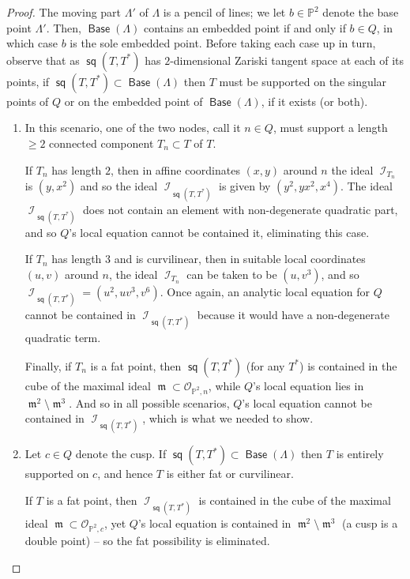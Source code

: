 \documentclass{article}
\renewcommand{\P}{\mathbb{P}}
\DeclareMathOperator{\I}{\mathcal{I}}
\renewcommand{\O}{\mathcal{O}}
\DeclareMathOperator{\s}{\mathsf{sq}}
\DeclareMathOperator{\Base}{\mathsf{Base}}
\DeclareMathOperator{\m}{\mathfrak{m}}
\begin{document}
\begin{proof}
    The moving part $\Lambda'$ of $\Lambda$ is a pencil of lines; we let $b \in \P^{2}$ denote the base point $\Lambda'$.  Then, $\Base (\Lambda)$ contains an embedded point if and only if $b \in Q$, in which case $b$ is the sole embedded point. Before taking each case up in turn, observe that as $\s(T,T^{*})$ has $2$-dimensional Zariski tangent space at each of its points, if $\s(T,T^{*}) \subset \Base(\Lambda)$ then $T$ must be supported on the singular points of $Q$ or on the embedded point of $\Base(\Lambda)$, if it exists (or both).
    \begin{enumerate}
        \item[(a)] In this scenario, one of the two nodes, call it $n \in Q$, must support a length $\geq 2$ connected component $T_{n} \subset T$ of $T$. 
        
        If $T_{n}$ has length $2$, then in affine coordinates $(x,y)$ around $n$ the ideal $\I_{T_{n}}$ is $(y,x^{2})$ and so the ideal $\I_{\s(T,T^{*})}$ is given by $(y^{2},yx^{2},x^{4})$.  The ideal $\I_{\s(T,T^{*})}$ does not contain an element with non-degenerate quadratic part, and so $Q$'s local equation cannot be contained it, eliminating this case.  
        
        If $T_{n}$ has length $3$ and is curvilinear, then in suitable  local coordinates $(u,v)$ around $n$, the ideal $\I_{T_{n}}$ can be taken to be $(u,v^{3})$, and so $\I_{\s(T,T^{*})} = (u^{2},uv^{3},v^{6})$.  Once again, an analytic local equation for $Q$ cannot  be contained in $\I_{\s(T,T^{*})}$ because it would have a non-degenerate quadratic term. 
        
        Finally, if $T_{n}$ is a fat point, then $\s(T,T^{*})$ (for any $T^{*}$) is contained in the cube of the maximal ideal $\m \subset \O_{\P^{2},n}$, while $Q$'s local equation lies in $\m^{2} \setminus \m^{3}$.  And so in all possible scenarios, $Q$'s local equation cannot be contained in $\I_{\s(T,T^{*})}$, which is what we needed to show.
        
        \item[(b)] Let $c \in Q$ denote the cusp. If $\s(T,T^{*}) \subset \Base(\Lambda)$ then $T$ is entirely supported on $c$, and hence $T$ is either fat or curvilinear. 
        
        If $T$ is a fat point, then $\I_{\s(T,T^{*})}$ is contained in the cube of the maximal ideal $\m \subset \O_{\P^{2},c}$, yet $Q$'s local equation is contained in $\m^{2} \setminus \m^{3}$ (a cusp is a double point) -- so the fat possibility is eliminated. 
        

\end{enumerate}
\end{proof}
\end{document}
